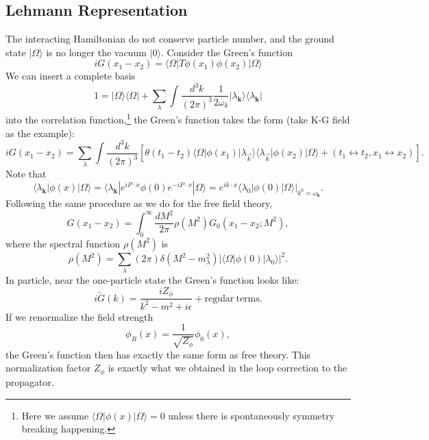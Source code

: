 \subsection{Lehmann Representation}
The interacting Hamiltonian do not conserve particle number, and the ground state $|\Omega\rangle$ is no longer the vacuum $|0\rangle$.
Consider the Green's function
\begin{equation}
	iG(x_1-x_2) = \langle\Omega|T\phi(x_1)\phi(x_2)|\Omega\rangle 
\end{equation}
We can insert a complete basis 
\begin{equation}
	1 = |\Omega\rangle\langle\Omega| + \sum_\lambda\int\frac{d^3 k}{(2\pi)^3}\frac{1}{2\omega_k}|\lambda_{\bm k}\rangle \langle\lambda_{\bm k}|
\end{equation}
into the correlation function,\footnote{Here we assume $\langle\Omega|\phi(x)|\Omega\rangle=0$ unless there is spontaneously symmetry breaking happening.} the Green's function takes the form (take K-G field as the example):
\begin{equation*}
	iG(x_1-x_2) = \sum_\lambda \int\frac{d^3 k}{(2\pi)^3}
	\left[\theta(t_1-t_2)\langle\Omega|\phi(x_1)|\lambda_{\vec k}\rangle\langle\lambda_{\vec k}|\phi(x_2)|\Omega\rangle + (t_1\leftrightarrow t_2, x_1 \leftrightarrow x_2)\right].
\end{equation*}
Note that
\begin{equation}
	\langle\lambda_{\bm k}|\phi(x)|\Omega\rangle 
	= \langle\lambda_{\bm k}|e^{iP\cdot x}\phi(0) e^{-iP\cdot x}|\Omega\rangle
	= e^{ik\cdot x} \left.\langle\lambda_{0}|\phi(0)|\Omega\rangle\right|_{k^0=\omega_{\bm k}}.
\end{equation}
Following the same procedure as we do for the free field theory, 
\begin{equation}
	G(x_1-x_2) = \int_0^\infty \frac{dM^2}{2\pi} \rho(M^2) G_0(x_1-x_2;M^2),
\end{equation}
where the spectral function $\rho(M^2)$ is
\begin{equation}
	\rho(M^2) = \sum_\lambda(2\pi)\delta(M^2-m_\lambda^2)|\langle\Omega|\phi(0)|\lambda_0\rangle|^2.
\end{equation}
In particle, near the one-particle state the Green's function looks like:
\begin{equation}
	i\tilde G(k) = \frac{iZ_{\phi}}{k^2-m^2+i\epsilon} + \mathrm{regular\ terms}.
\end{equation}
If we renormalize the field strength 
\begin{equation}
	\phi_R(x) = \frac{1}{\sqrt{Z_\phi}}\phi_0(x),
\end{equation}
the Green's function then has exactly the same form as free theory.
This normalization factor $Z_\phi$ is exactly what we obtained in the loop correction to the propagator.



